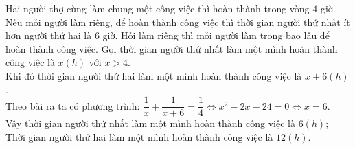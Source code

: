 \begin{ex}%
Hai người thợ cùng làm chung một công việc thì hoàn thành trong vòng $4$ giờ. Nếu mỗi người làm riêng, để hoàn thành công việc thì thời gian người thứ nhất ít hơn người thứ hai là $6$ giờ. Hỏi làm riêng thì mỗi người làm trong bao lâu để hoàn thành công việc.
\loigiai
    {
Gọi thời gian người thứ nhất làm một mình hoàn thành công việc là $x (h)$ với $x>4$.\\
Khi đó thời gian người thứ hai làm một mình hoàn thành công việc là $x+6 (h)$.\\
Theo bài ra ta có phương trình: $\dfrac{1}{x}+\dfrac{1}{x+6}=\dfrac{1}{4} \Leftrightarrow x^2-2x-24=0 \Leftrightarrow x=6$.\\
Vậy thời gian người thứ nhất làm một mình hoàn thành công việc là $6 (h)$; \\
Thời gian người thứ hai làm một mình hoàn thành công việc là $12 (h)$.
    }
\end{ex}

